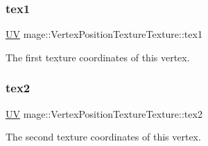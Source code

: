 \subsubsection{\texorpdfstring{tex1}{tex1}}
{\footnotesize\ttfamily \hyperlink{structmage_1_1_u_v}{UV} mage\+::\+Vertex\+Position\+Texture\+Texture\+::tex1}

The first texture coordinates of this vertex. \hypertarget{structmage_1_1_vertex_position_texture_texture_a5a41669f18385d932c1490ff20c80bed}{}\label{structmage_1_1_vertex_position_texture_texture_a5a41669f18385d932c1490ff20c80bed} 
\subsubsection{\texorpdfstring{tex2}{tex2}}
{\footnotesize\ttfamily \hyperlink{structmage_1_1_u_v}{UV} mage\+::\+Vertex\+Position\+Texture\+Texture\+::tex2}

The second texture coordinates of this vertex. 
